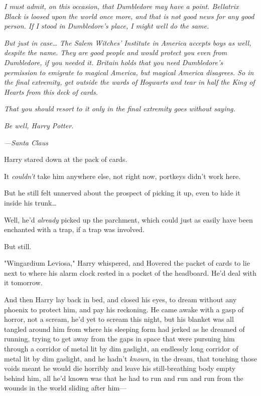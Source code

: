 \emph{I must admit, on this occasion, that Dumbledore may have a point. 
Bellatrix Black is loosed upon the world once more, and that is not good news 
for any good person. If I stood in Dumbledore's place, I might well do the 
same.}

\emph{But just in case{\ldots} The Salem Witches' Institute in America accepts 
boys as well, despite the name. They are good people and would protect you even 
from Dumbledore, if you needed it. Britain holds that you need Dumbledore's 
permission to emigrate to magical America, but magical America disagrees. So in 
the final extremity, get outside the wards of Hogwarts and tear in half the 
King of Hearts from this deck of cards.}

\emph{That you should resort to it only in the final extremity goes without 
saying.}

\emph{Be well, Harry Potter.}

\emph{---Santa Claus}

Harry stared down at the pack of cards.

It \emph{couldn't} take him anywhere else, not right now, portkeys didn't work 
here.

But he still felt unnerved about the prospect of picking it up, even to hide it 
inside his trunk{\ldots}

Well, he'd \emph{already} picked up the parchment, which could just as easily 
have been enchanted with a trap, if a trap was involved.

But still.

"Wingardium Leviosa," Harry whispered, and Hovered the packet of cards to lie 
next to where his alarm clock rested in a pocket of the headboard. He'd deal 
with it tomorrow.

And then Harry lay back in bed, and closed his eyes, to dream without any 
phoenix to protect him, and pay his reckoning.
\sbreak
He came awake with a gasp of horror, not a scream, he'd yet to scream this 
night, but his blanket was all tangled around him from where his sleeping form 
had jerked as he dreamed of running, trying to get away from the gaps in space 
that were pursuing him through a corridor of metal lit by dim gaslight, an 
endlessly long corridor of metal lit by dim gaslight, and he hadn't 
\emph{known}, in the dream, that touching those voids meant he would die 
horribly and leave his still-breathing body empty behind him, all he'd known 
was that he had to run and run and run from the wounds in the world sliding 
after him---

